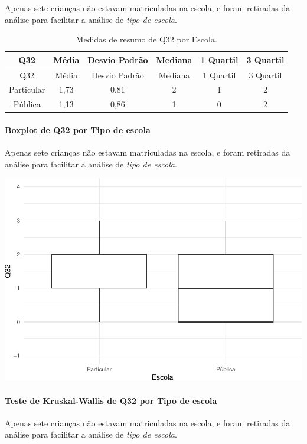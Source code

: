 \documentclass[]{article}
\let\oldparagraph\paragraph
\renewcommand{\paragraph}[1]{\oldparagraph{#1}\mbox{}}
\begin{document}
Apenas sete crianças não estavam matriculadas na escola, e foram retiradas da análise para facilitar a análise de \emph{tipo de escola}.

\begin{longtable}[]{@{}cccccc@{}}
\caption{\label{tab:unnamed-chunk-1118}Medidas de resumo de Q32 por Escola.}\tabularnewline
\toprule
Q32 & Média & Desvio Padrão & Mediana & 1 Quartil & 3 Quartil\tabularnewline
\midrule
\endfirsthead
\toprule
Q32 & Média & Desvio Padrão & Mediana & 1 Quartil & 3 Quartil\tabularnewline
\midrule
\endhead
Particular & 1,73 & 0,81 & 2 & 1 & 2\tabularnewline
Pública & 1,13 & 0,86 & 1 & 0 & 2\tabularnewline
\bottomrule
\end{longtable}

\hypertarget{boxplot-de-q32-por-tipo-de-escola}{%
\paragraph{Boxplot de Q32 por Tipo de escola}\label{boxplot-de-q32-por-tipo-de-escola}}

Apenas sete crianças não estavam matriculadas na escola, e foram retiradas da análise para facilitar a análise de \emph{tipo de escola}.

\begin{center}\includegraphics[width=0.75\linewidth]{relatorio_covid19_files/figure-latex/unnamed-chunk-1119-1} \end{center}

\hypertarget{teste-de-kruskal-wallis-de-q32-por-tipo-de-escola}{%
\paragraph{Teste de Kruskal-Wallis de Q32 por Tipo de escola}\label{teste-de-kruskal-wallis-de-q32-por-tipo-de-escola}}

Apenas sete crianças não estavam matriculadas na escola, e foram retiradas da análise para facilitar a análise de \emph{tipo de escola}.
\end{document}
